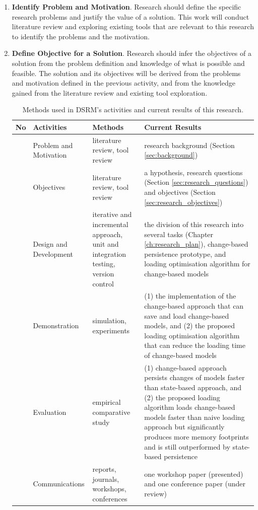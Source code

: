 \documentclass[12pt, a4paper]{report} \usepackage[titletoc]{appendix}
\begin{document}
\begin{enumerate}
    \item \textbf{Identify Problem and Motivation}. Research should define the specific research problems and justify the value of a solution. This work will conduct literature review and exploring existing tools that are relevant to this research to identify the problems and the motivation.
    \item \textbf{Define Objective for a Solution}. Research should infer the objectives of a solution from the problem definition and knowledge of what is possible and feasible. The solution and its objectives will be derived from the problems and motivation defined in the previous activity, and from the knowledge gained from the literature review and existing tool exploration.
   
   \begin{table}[H]
       \centering
       \caption{Methods used in DSRM's activities and current results of this research.}
       \label{table:research_progress}
       \begin{tabular}
           {|>{\centering\arraybackslash}p{0.6cm}|>{\centering\arraybackslash}p{3cm}|>{\centering\arraybackslash}p{3.1cm}|>{\centering\arraybackslash}p{6.5cm}|}
           \hline 
           \textbf{No}&\textbf{Activities}&\textbf{Methods}&\textbf{Current Results}\\
           \hline 
           1 & Problem and Motivation &literature review, tool review & research background (Section \ref{sec:background})\\
           \hline 
           2 & Objectives & literature review, tool review & a hypothesis, research questions (Section \ref{sec:research_questions}) and objectives  (Section \ref{sec:research_objectives})\\
           \hline 
           3 & Design and Development & iterative and incremental approach, unit and integration testing, version control & the division of this research into several tasks (Chapter \ref{ch:research_plan}), change-based persistence prototype, and loading optimisation algorithm for change-based models\\
           \hline 
           4 & Demonstration & simulation, experiments  & (1) the implementation of the change-based approach that can save and load change-based models, and (2) the proposed loading optimisation algorithm that can reduce the loading time of change-based models \\
           \hline 
           5 & Evaluation & empirical comparative study & (1) change-based approach persists changes of models faster than state-based approach, and (2) the proposed loading algorithm loads change-based models faster than naive loading approach but significantly produces more memory footprints and is still outperformed by state-based persistence\\
           \hline 
           6 & Communications & reports, journals, workshops, conferences & one workshop paper (presented) and one conference paper (under review)\\
           \hline 
       \end{tabular} 
   \end{table}
    

\end{enumerate}
\end{document}
